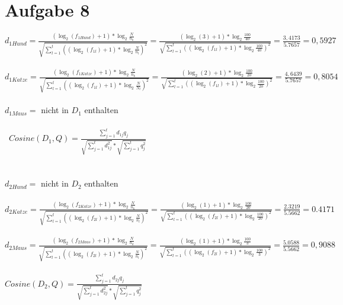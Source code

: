 \section*{Aufgabe 8}

$d_{1Hund} =\frac{(\log_{2}(f_{1Hund}) + 1) * \log_{2}\frac{N}{n_{k}}}{\sqrt{\sum_{l=1}^{t}((\log_{2}(f_{1l}) + 1) * \log_{2} \frac{N}{n_{l}})^{2}}} = \frac{(\log_{2}(3) + 1) * \log_{2}\frac{100}{40}}{\sqrt{\sum_{l=1}^{t}((\log_{2}(f_{1l}) + 1) * \log_{2} \frac{100}{40})^{2}}} = \frac{3,4173}{5.7657} = 0,5927$ \\
\ \\
$d_{1Katze} =\frac{(\log_{2}(f_{1Katze}) + 1) * \log_{2}\frac{N}{n_{k}}}{\sqrt{\sum_{l=1}^{t}((\log_{2}(f_{1l}) + 1) * \log_{2} \frac{N}{N_{l}})^{2}}} = \frac{(\log_{2}(2) + 1) * \log_{2}\frac{100}{20}}{\sqrt{\sum_{l=1}^{t}((\log_{2}(f_{1l}) + 1) * \log_{2} \frac{100}{20})^{2}}} = \frac{4,6439}{5.7657} = 0,8054$ \\
\ \\
$d_{1Maus} =$ nicht in $D_{1}$ enthalten \\
\\ \
$Cosine(D_{1}, Q) = \frac{\sum_{j=1}^{t}d_{1j}q_{j}}{\sqrt{\sum_{j=1}^{t}d_{1j}^{2}} * \sqrt{\sum_{j=1}^{t}q_{j}^{2}}}$ \\
\ \\
\ \\
$d_{2Hund} =$ nicht in $D_{2}$ enthalten \\
\ \\
$d_{2Katze} =\frac{(\log_{2}(f_{2Katze}) + 1) * \log_{2}\frac{N}{n_{k}}}{\sqrt{\sum_{l=1}^{t}((\log_{2}(f_{2l}) + 1) * \log_{2} \frac{N}{n_{l}})^{2}}} = \frac{(\log_{2}(1) + 1) * \log_{2}\frac{100}{20}}{\sqrt{\sum_{l=1}^{t}((\log_{2}(f_{2l}) + 1) * \log_{2} \frac{100}{20})^{2}}} = \frac{2.3219}{5.5662} = 0.4171$ \\
\ \\ 
$d_{2Maus} =\frac{(\log_{2}(f_{2Maus}) + 1) * \log_{2}\frac{N}{n_{k}}}{\sqrt{\sum_{l=1}^{t}((\log_{2}(f_{2l}) + 1) * \log_{2} \frac{N}{n_{l}})^{2}}} = \frac{(\log_{2}(1) + 1) * \log_{2}\frac{100}{3}}{\sqrt{\sum_{l=1}^{t}((\log_{2}(f_{2l}) + 1) * \log_{2} \frac{100}{3})^{2}}} =\frac{5.0588}{5.5662} = 0,9088$ \\
\ \\
$Cosine(D_{2}, Q) = \frac{\sum_{j=1}^{t}d_{2j}q_{j}}{\sqrt{\sum_{j=1}^{t}d_{2j}^{2}} * \sqrt{\sum_{j=1}^{t}q_{j}^{2}}}$